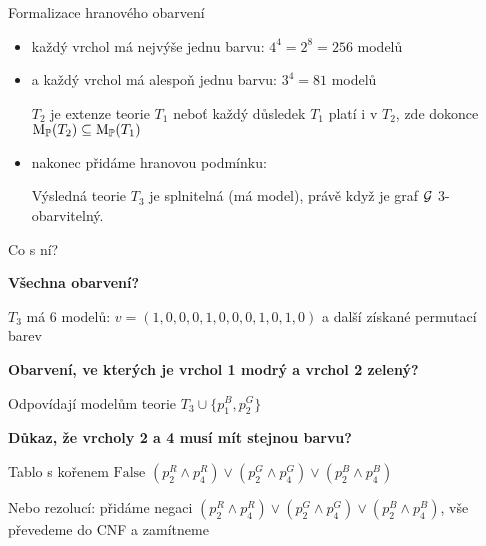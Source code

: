 \documentclass{beamer}
\begin{document}
\begin{frame}{Formalizace hranového obarvení}
\begin{itemize}
    \item každý vrchol má nejvýše jednu barvu: $4^4=2^8=256$ modelů

    \item a každý vrchol má alespoň jednu barvu: $3^4=81$ modelů
    
    $T_2$ je \alert{extenze} teorie $T_1$ neboť \alert{každý důsledek $T_1$ platí i v $T_2$}, zde dokonce $\operatorname{M}_\mathbb P(T_2)\subseteq\operatorname{M}_\mathbb P(T_1)$

    \item nakonec přidáme \alert{hranovou podmínku}:
     
    Výsledná teorie \( T_3 \) je \alert{splnitelná} (má model), právě když je graf \( \mathcal{G} \) 3-obarvitelný.   
\end{itemize}
\end{frame}


\begin{frame}{Co s ní?}

\textbf{Všechna obarvení?} 

$T_3$ má 6 modelů: \( v = (1,0,0,0,1,0,0,0,1,0,1,0) \) a další získané permutací barev \vspace{-12pt}
\begin{center}
\end{center}

\textbf{Obarvení, ve kterých je vrchol 1 modrý a vrchol 2 zelený?} 

Odpovídají modelům teorie \( T_3 \cup \{ p_1^B, p_2^G\} \)

\textbf{Důkaz, že vrcholy 2 a 4 musí mít stejnou barvu?}

\alert{Tablo} s kořenem $\text{False  }(p_2^R \land p_4^R)\lor(p_2^G \land p_4^G)\lor(p_2^B \land p_4^B)$

Nebo \alert{rezolucí}: přidáme \alert{negaci} \( (p_2^R \land p_4^R)\lor(p_2^G \land p_4^G)\lor(p_2^B \land p_4^B) \), vše převedeme do CNF a zamítneme

\end{frame}
\end{document}
